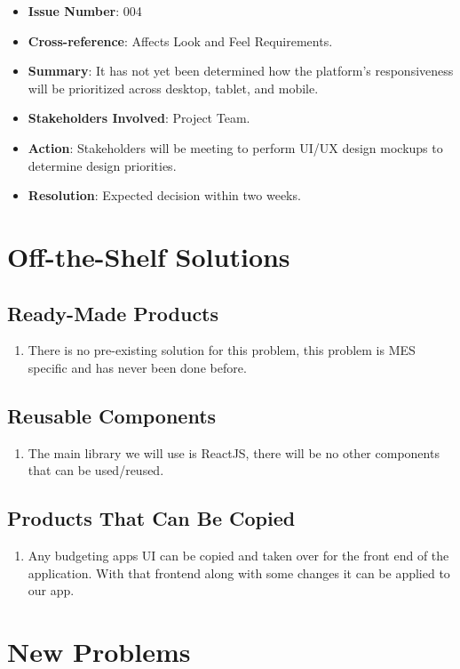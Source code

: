 \documentclass[12pt]{article}
\begin{document}
\begin{itemize}
  \bigskip

  \item \textbf{Issue Number}: 004
  \item \textbf{Cross-reference}: Affects Look and Feel Requirements.
  \item \textbf{Summary}: It has not yet been determined how the platform's responsiveness will be prioritized across desktop, tablet, and mobile.
  \item \textbf{Stakeholders Involved}: Project Team.
  \item \textbf{Action}: Stakeholders will be meeting to perform UI/UX design mockups to determine design priorities.
  \item \textbf{Resolution}: Expected decision within two weeks.
\end{itemize}

\section{Off-the-Shelf Solutions}
\subsection{Ready-Made Products}
\begin{enumerate}
  \item There is no pre-existing solution for this problem, this problem is MES specific and has never been done before.
\end{enumerate}
\subsection{Reusable Components}
\begin{enumerate}
  \item The main library we will use is ReactJS, there will be no other components that can be used/reused. 
\end{enumerate}
\subsection{Products That Can Be Copied}
\begin{enumerate}
  \item Any budgeting apps UI can be copied and taken over for the front end of the application. With that frontend along with some changes it can be applied to our app. 
\end{enumerate}

\section{New Problems}
\end{document}
